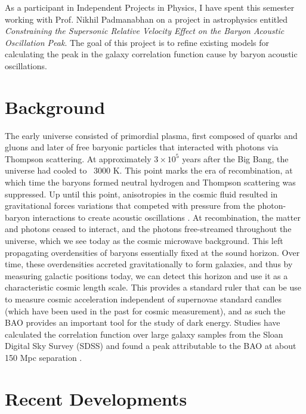\documentclass[12pt]{article}
\begin{document}
\maketitle


As a participant in Independent Projects in Physics, I have spent this semester working with Prof. Nikhil Padmanabhan on a project in astrophysics entitled \emph{Constraining the Supersonic Relative Velocity Effect on the Baryon Acoustic Oscillation Peak}. The goal of this project is to refine existing models for calculating the peak in the galaxy correlation function cause by baryon acoustic oscillations.

\section{Background}

The early universe consisted of primordial plasma, first composed of quarks and gluons and later of free baryonic particles that interacted with photons via Thompson scattering. At approximately $3\times10^{5}$ years after the Big Bang, the universe had cooled to ~3000 K. This point marks the era of recombination, at which time the baryons formed neutral hydrogen and Thompson scattering was suppressed. Up until this point, anisotropies in the cosmic fluid resulted in gravitational forces variations that competed with pressure from the photon-baryon interactions to create acoustic oscillations \cite{Eisenstein}. At recombination, the matter and photons ceased to interact, and the photons free-streamed throughout the universe, which we see today as the cosmic microwave background. This left propagating overdensities of baryons essentially fixed at the sound horizon. Over time, these overdensities accreted gravitationally to form galaxies, and thus by measuring galactic positions today, we can detect this horizon and use it as a characteristic cosmic length scale. This provides a standard ruler that can be use to measure cosmic acceleration independent of supernovae standard candles (which have been used in the past for cosmic measurement), and as such the BAO provides an important tool for the study of dark energy. Studies have calculated the correlation function over large galaxy samples from the Sloan Digital Sky Survey (SDSS) and found a peak attributable to the BAO at about 150 Mpc separation \cite{Eisensteinetal}.

\section{Recent Developments}
\end{document}
